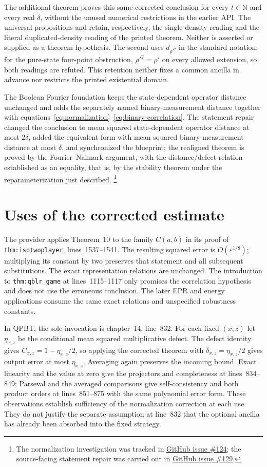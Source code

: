 \documentclass[11pt]{article}
\renewcommand{\ghissue}[1]{%
  \href{https://github.com/Dengnifer/MIPStarRE-QPBT/issues/#1}{GitHub issue \##1}}
\begin{document}
The additional theorem
 proves this
same corrected conclusion for every $t\in\mathbb N$ and every real
$\delta$, without the unused numerical restrictions in the earlier API.
The universal propositions  and
 retain, respectively, the
single-density reading and the literal duplicated-density reading of the
printed theorem. Neither is asserted or supplied as a theorem hypothesis.
The second uses $d_{\rho'^2}$ in the standard notation; for the pure-state
four-point obstruction, $\rho'^2=\rho'$ on every allowed extension, so both
readings are refuted. This retention neither fixes a common ancilla in
advance nor restricts the printed existential domain.

The Boolean Fourier foundation keeps the state-dependent operator distance
unchanged and adds the separately named binary-measurement distance together
with equations~\eqref{eq:normalization}--\eqref{eq:binary-correlation}.  The
statement repair changed the conclusion to mean squared state-dependent
operator distance at most $2\delta$, added the equivalent form with mean
squared binary-measurement distance at most $\delta$, and synchronized the
blueprint; the realigned theorem is proved by the Fourier--Naimark argument,
with the distance/defect relation established as an equality, that is, by the
stability theorem under the reparameterization just described.%
\footnote{The normalization investigation was tracked in
\ghissue{124}; the source-facing statement repair was carried out in
\ghissue{129}.}

\section{Uses of the corrected estimate}

The provider applies Theorem~10 to the family $C(a,b)$ in its proof of
\texttt{thm:isotwoplayer}, lines~1537--1541. The resulting squared error is
$O(\varepsilon^{1/8})$; multiplying its constant by two preserves that
statement and all subsequent substitutions. The exact representation
relations are unchanged. The introduction to \texttt{thm:qblr\_game} at
lines~1115--1117 only promises the correlation hypothesis and does not use
the erroneous conclusion. The later EPR and energy applications consume
the same exact relations and unspecified robustness constants.

In QPBT, the sole invocation is chapter~14, line~832. For each fixed $(x,z)$
let $\eta_{x,z}$ be the conditional mean squared multiplicative defect.
The defect identity gives $C_{x,z}=1-\eta_{x,z}/2$, so applying the corrected
theorem with $\delta_{x,z}=\eta_{x,z}/2$ gives output error at most
$\eta_{x,z}$. Averaging again preserves the incoming bound. Exact linearity
and the value at zero give the projectors and completeness at lines~834--849;
Parseval and the averaged comparisons give self-consistency and both product
orders at lines~851--875 with the same polynomial error form.
These observations establish sufficiency of the normalization correction at
each use. They do not justify the separate assumption at line~832 that the
optional ancilla has already been absorbed into the fixed strategy.
\end{document}
